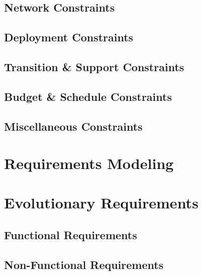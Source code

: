 \documentclass[UTF8]{article}
\begin{document}
  \subsection{Network Constraints}

  \subsection{Deployment Constraints}

  \subsection{Transition \& Support Constraints}

  \subsection{Budget \& Schedule Constraints}

  \subsection{Miscellaneous Constraints}

\section{Requirements Modeling}

\section{Evolutionary Requirements}
  \subsection{Functional Requirements}

  \subsection{Non-Functional Requirements}
\end{document}
